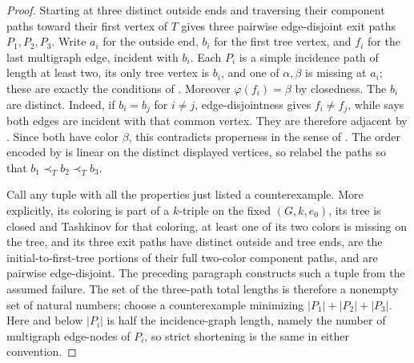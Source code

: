 \begin{proof}
Starting at three distinct outside ends and traversing their component
paths toward their first vertex of $T$ gives three pairwise edge-disjoint
exit paths $P_1,P_2,P_3$.  Write $a_i$ for the outside end, $b_i$ for the
first tree vertex, and $f_i$ for the last multigraph edge, incident with
$b_i$.  Each $P_i$ is a simple incidence path of length at least two, its
only tree vertex is $b_i$, and one of $\alpha,\beta$ is missing at $a_i$;
these are exactly the conditions of .  Moreover
$\varphi(f_i)=\beta$ by closedness.  The $b_i$ are distinct.  Indeed, if
$b_i=b_j$ for $i\ne j$, edge-disjointness gives $f_i\ne f_j$, while
 says both edges are incident with that common vertex.
They are therefore adjacent by .  Since both have
color $\beta$, this contradicts properness in the sense of
.
The order encoded by  is linear on the distinct
displayed vertices, so relabel the paths so that
$b_1\prec_T b_2\prec_T b_3$.

Call any tuple with all the properties just listed a counterexample.  More
explicitly, its coloring is part of a $k$-triple on the fixed
$(G,k,e_0)$, its tree is closed and Tashkinov for that coloring, at least
one of its two colors is missing on the tree, and its three exit paths have distinct
outside and tree ends, are the initial-to-first-tree portions of their full
two-color component paths, and are pairwise edge-disjoint.  The preceding
paragraph constructs such a tuple from the assumed failure.  The set of
the three-path total lengths is therefore a nonempty set of natural
numbers; choose a counterexample minimizing
$|P_1|+|P_2|+|P_3|$.  Here and below $|P_i|$ is half the incidence-graph
length, namely the number of multigraph edge-nodes of $P_i$, so strict
shortening is the same in either convention.


\end{proof}

